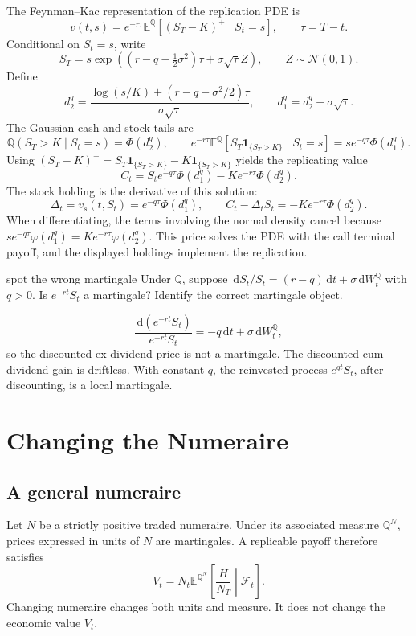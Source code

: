 \documentclass[10pt]{article}
\newcommand{\E}{\mathbb E}
\newcommand{\Q}{\mathbb Q}
\newcommand{\1}{\mathbf 1}
\newcommand{\cF}{\mathcal F}
\newcommand{\dd}{\,\mathrm d}
\newcommand{\Nlaw}{\mathcal N}
\theoremstyle{definition}
\begin{document}
The Feynman--Kac representation of the replication PDE is
\[
 v(t,s)=e^{-r\tau}\E^{\Q}[(S_T-K)^+\mid S_t=s],
 \qquad \tau=T-t.
\]
Conditional on \(S_t=s\), write
\[
S_T=s\exp\!\left((r-q-\tfrac12\sigma^2)\tau
             +\sigma\sqrt\tau Z\right),
\qquad Z\sim\Nlaw(0,1).
\]
Define
\[
d_2^q=\frac{\log(s/K)+(r-q-\sigma^2/2)\tau}{\sigma\sqrt\tau},
\qquad d_1^q=d_2^q+\sigma\sqrt\tau.
\]
The Gaussian cash and stock tails are
\[
\Q(S_T>K\mid S_t=s)=\Phi(d_2^q),
\qquad
 e^{-r\tau}\E^\Q[S_T\1_{\{S_T>K\}}\mid S_t=s]
 =se^{-q\tau}\Phi(d_1^q).
\]
Using \((S_T-K)^+=S_T\1_{\{S_T>K\}}-K\1_{\{S_T>K\}}\) yields the
replicating value
\[
\boxed{C_t=S_te^{-q\tau}\Phi(d_1^q)-Ke^{-r\tau}\Phi(d_2^q).}
\]
The stock holding is the derivative of this solution:
\[
\boxed{\Delta_t=v_s(t,S_t)=e^{-q\tau}\Phi(d_1^q),}
\qquad
C_t-\Delta_tS_t=-Ke^{-r\tau}\Phi(d_2^q).
\]
When differentiating, the terms involving the normal density cancel because
\(s e^{-q\tau}\varphi(d_1^q)=K e^{-r\tau}\varphi(d_2^q)\).
This price solves the PDE with the call terminal payoff, and the displayed
holdings implement the replication.

\begin{studentexercise}{spot the wrong martingale}
Under \(\Q\), suppose
\(\dd S_t/S_t=(r-q)\dd t+\sigma\dd W_t^\Q\) with \(q>0\).
Is \(e^{-rt}S_t\) a martingale? Identify the correct martingale object.
\end{studentexercise}
\begin{shortsolution}
\[
\frac{\dd(e^{-rt}S_t)}{e^{-rt}S_t}
=-q\dd t+\sigma\dd W_t^\Q,
\]
so the discounted ex-dividend price is not a martingale. The discounted
cum-dividend gain is driftless. With constant \(q\), the reinvested process
\(e^{qt}S_t\), after discounting, is a local martingale.
\end{shortsolution}

\section{Changing the Numeraire}

\subsection{A general numeraire}

Let \(N\) be a strictly positive traded numeraire. Under its associated
measure \(\Q^N\), prices expressed in units of \(N\) are martingales. A
replicable payoff therefore satisfies
\[
\boxed{
V_t=N_t\E^{\Q^N}\left[\frac{H}{N_T}\middle|\cF_t\right].}
\]
Changing numeraire changes both units and measure. It does not change the
economic value \(V_t\).
\end{document}
